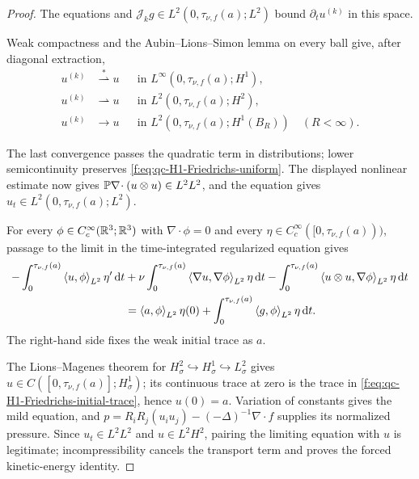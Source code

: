\begin{proof}
The equations and \(\mathcal J_kg\in L^2(0,\tau_{\nu,f}(a);L^2)\) bound
\(\partial_tu^{(k)}\) in this space.
\begin{samepage}
Weak compactness and the
Aubin--Lions--Simon lemma \cite{Aubin1963,Simon1987} on every ball give, after diagonal
extraction,
\begin{align*}
 u^{(k)}&\stackrel{*}{\rightharpoonup} u
 &&\text{in }L^\infty(0,\tau_{\nu,f}(a);H^1),\\
 u^{(k)}&\rightharpoonup u
 &&\text{in }L^2(0,\tau_{\nu,f}(a);H^2),\\
 u^{(k)}&\longrightarrow u
 &&\text{in }L^2(0,\tau_{\nu,f}(a);H^1(B_R))
 \quad(R<\infty).
\end{align*}
\par
\end{samepage}
The last convergence passes the quadratic term in distributions; lower
semicontinuity preserves \eqref{f:eq:qc-H1-Friedrichs-uniform}.  The displayed
nonlinear estimate now gives
\(\mathbb P\nabla\!\cdot(u\otimes u)\in L^2L^2\), and the equation gives
\(u_t\in L^2(0,\tau_{\nu,f}(a);L^2)\).
\begin{samepage}
For every
\(\phi\in C_c^\infty(\mathbb R^3;\mathbb R^3)\) with \(\nabla\cdot\phi=0\) and every
\(\eta\in C_c^\infty([0,\tau_{\nu,f}(a)))\), passage to the limit in the
time-integrated regularized equation gives
\begin{align}
 -\int_0^{\tau_{\nu,f}(a)}\left\langle u,\phi\right\rangle_{L^2}\eta'\,\mathrm d t
 &+\nu\int_0^{\tau_{\nu,f}(a)}\left\langle \nabla u,\nabla\phi\right\rangle_{L^2}\eta\,\mathrm d t
 -\int_0^{\tau_{\nu,f}(a)}\left\langle u\otimes u,\nabla\phi\right\rangle_{L^2}\eta\,\mathrm d t
 \notag\\
 &=\left\langle a,\phi\right\rangle_{L^2}\eta(0)
 +\int_0^{\tau_{\nu,f}(a)}\left\langle g,\phi\right\rangle_{L^2}\eta\,\mathrm d t.
 \label{f:eq:qc-H1-Friedrichs-initial-trace}
\end{align}
The right-hand side fixes the weak initial trace as \(a\).
\par
\end{samepage}
The Lions--Magenes theorem \cite{LionsMagenes1972} for
\(H^2_\sigma\hookrightarrow H^1_\sigma\hookrightarrow L^2_\sigma\)
gives \(u\in C([0,\tau_{\nu,f}(a)];H^1_\sigma)\); its continuous trace at zero is
the trace in \eqref{f:eq:qc-H1-Friedrichs-initial-trace}, hence \(u(0)=a\).
Variation of constants gives the mild equation, and
\(p=R_iR_j(u_i u_j)-(-\Delta)^{-1}\nabla\cdot f\) supplies its normalized
pressure.  Since
\(u_t\in L^2L^2\) and \(u\in L^2H^2\), pairing the limiting equation with
\(u\) is legitimate; incompressibility cancels the transport term and proves
the forced kinetic-energy identity.


\end{proof}

